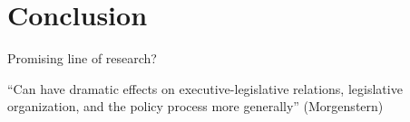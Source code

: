 \documentclass[letter,12pt]{article}
\begin{document}




\section{Conclusion}

Promising line of research?

``Can have dramatic effects on executive-legislative relations, legislative organization, and the policy process more generally'' (Morgenstern) 













\end{document}
